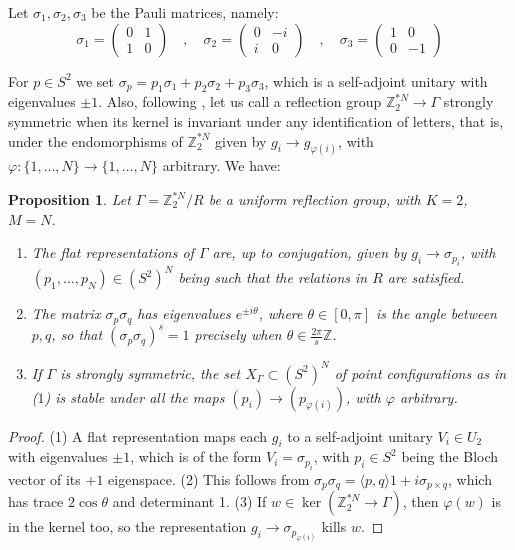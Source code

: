 \documentclass[12pt]{amsart}
\newtheorem{proposition}[theorem]{Proposition}
\theoremstyle{definition}
\begin{document}
Let $\sigma_1,\sigma_2,\sigma_3$ be the Pauli matrices, namely:
$$\sigma_1=\begin{pmatrix}0&1\\ 1&0\end{pmatrix}\quad,\quad\sigma_2=\begin{pmatrix}0&-i\\ i&0\end{pmatrix}\quad,\quad\sigma_3=\begin{pmatrix}1&0\\ 0&-1\end{pmatrix}$$

For $p\in S^2$ we set $\sigma_p=p_1\sigma_1+p_2\sigma_2+p_3\sigma_3$, which is a self-adjoint unitary with eigenvalues $\pm1$. Also, following \cite{rw2}, let us call a reflection group $\mathbb Z_2^{*N}\to\Gamma$ strongly symmetric when its kernel is invariant under any identification of letters, that is, under the endomorphisms of $\mathbb Z_2^{*N}$ given by $g_i\to g_{\varphi(i)}$, with $\varphi:\{1,\ldots,N\}\to\{1,\ldots,N\}$ arbitrary. We have:

\begin{proposition}
Let $\Gamma=\mathbb Z_2^{*N}/R$ be a uniform reflection group, with $K=2$, $M=N$.
\begin{enumerate}
\item The flat representations of $\Gamma$ are, up to conjugation, given by $g_i\to\sigma_{p_i}$, with $(p_1,\ldots,p_N)\in(S^2)^N$ being such that the relations in $R$ are satisfied.

\item The matrix $\sigma_p\sigma_q$ has eigenvalues $e^{\pm i\theta}$, where $\theta\in[0,\pi]$ is the angle between $p,q$, so that $(\sigma_p\sigma_q)^s=1$ precisely when $\theta\in\frac{2\pi}{s}\mathbb Z$.

\item If $\Gamma$ is strongly symmetric, the set $X_\Gamma\subset(S^2)^N$ of point configurations as in ($1$) is stable under all the maps $(p_i)\to(p_{\varphi(i)})$, with $\varphi$ arbitrary.
\end{enumerate}
\end{proposition}

\begin{proof}
(1) A flat representation maps each $g_i$ to a self-adjoint unitary $V_i\in U_2$ with eigenvalues $\pm1$, which is of the form $V_i=\sigma_{p_i}$, with $p_i\in S^2$ being the Bloch vector of its $+1$ eigenspace. (2) This follows from $\sigma_p\sigma_q=\langle p,q\rangle1+i\sigma_{p\times q}$, which has trace $2\cos\theta$ and determinant 1. (3) If $w\in\ker(\mathbb Z_2^{*N}\to\Gamma)$, then $\varphi(w)$ is in the kernel too, so the representation $g_i\to\sigma_{p_{\varphi(i)}}$ kills $w$.
\end{proof}
\end{document}
